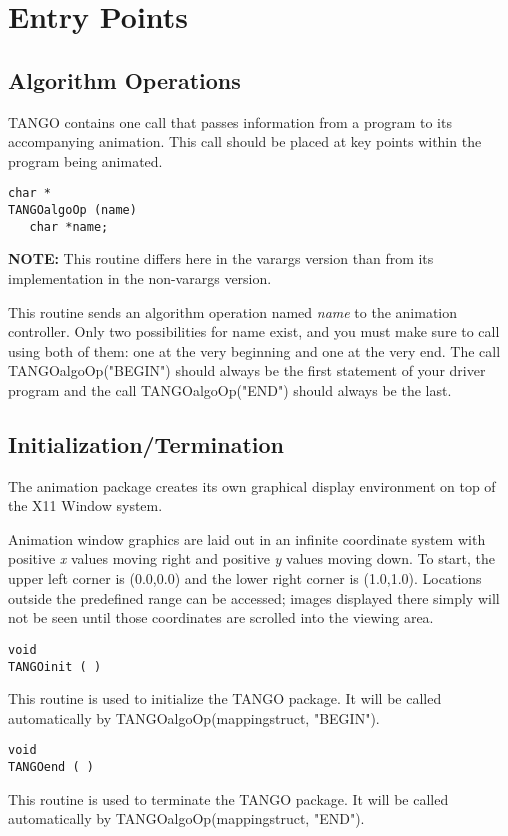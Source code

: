 \section{Entry Points}
\subsection{Algorithm Operations}
TANGO contains one call that passes information from a program to its
accompanying animation.  This call should be placed at key points
within the program being animated.

\vspace{1em}
\begin{verbatim}
char *
TANGOalgoOp (name)
   char *name;
\end{verbatim}
{\bf NOTE:} This routine differs here in the varargs version than from
its implementation in the non-varargs version.

This routine sends an algorithm operation named {\em name} to the
animation controller.  Only two possibilities for name exist, and you
must make sure to call using both of them: one at the very beginning
and one at the very end.  The call TANGOalgoOp("BEGIN") should always
be the first statement of your driver program and the call
TANGOalgoOp("END") should always be the last.

\subsection{Initialization/Termination}
The animation package creates its own graphical display environment on top 
of the X11 Window system.

Animation window graphics are laid out in an infinite coordinate system with
positive {\em x} values moving right and positive {\em y} values moving down.
To start, the upper left corner is (0.0,0.0) and the lower right corner is
(1.0,1.0).  Locations outside the predefined range can be accessed; images
displayed there simply will not be seen until those coordinates are scrolled
into the viewing area.

\vspace{1em}
\begin{verbatim}
void
TANGOinit ( )
\end{verbatim}
This routine is used to initialize the TANGO package.  It will be called
automatically by TANGOalgoOp(mappingstruct, "BEGIN").

\vspace{1em}
\begin{verbatim}
void
TANGOend ( )
\end{verbatim}
This routine is used to terminate the TANGO package.  It will be called
automatically by TANGOalgoOp(mappingstruct, "END").


